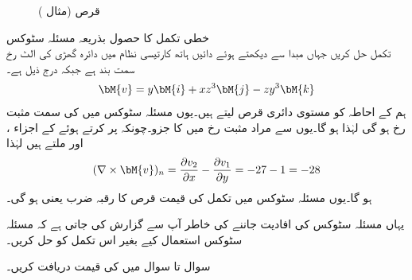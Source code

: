 % 
\begin{figure}
\centering
{}
\caption{قرص (مثال )}
\label{شکل_مثال_خطی_تکمل_گردش_مفہوم}
\end{figure}
\quad خطی تکمل کا حصول بذریعہ مسئلہ سٹوکس\\
تکمل  حل کریں جہاں مبدا سے دیکھتے ہوئے  دائیں ہاتھ کارتیسی نظام میں دائرہ   گھڑی کی الٹ رخ سمت بند ہے جبکہ  درج ذیل ہے۔
\begin{align*}
\bM{v}=y\bM{i}+xz^3\bM{j}-zy^3\bM{k}
\end{align*}
ہم  کے احاطہ  کو مستوی دائری قرص  لیتے ہیں۔یوں مسئلہ سٹوکس میں  کی سمت مثبت  رخ ہو گی لہٰذا  ہو گا۔یوں  سے مراد مثبت  رخ میں  کا جزو۔چونکہ  پر کرتے ہوئے  کے اجزاء ،  اور  ملتے ہیں لہٰذا
\begin{align*}
(\nabla \times \bM{v})_n=\frac{\partial v_2}{\partial x}-\frac{\partial v_1}{\partial y}=-27-1=-28
\end{align*}
ہو گا۔یوں مسئلہ سٹوکس میں تکمل  کی قیمت قرص کا رقبہ   ضرب   یعنی  ہو گی۔

یہاں مسئلہ سٹوکس کی افادیت جاننے کی خاطر آپ سے گزارش کی جاتی ہے کہ مسئلہ سٹوکس استعمال کیے بغیر اس تکمل کو حل کریں۔

سوال  تا سوال  میں  کی قیمت دریافت کریں۔

